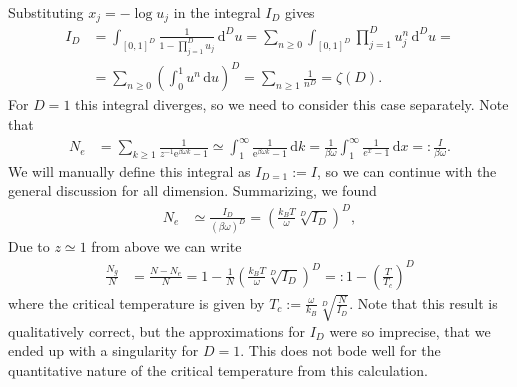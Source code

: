 \documentclass[english, parskip=full]{scrartcl}
\newcommand{\intx}{}
\newcommand{\intr}{}
\newcommand{\kla}{}
\newcommand{\e}{\text{e}}
\begin{document}
Substituting $x_j = -\log u_j$ in the integral $I_D$ gives
\begin{align}
I_D &=  \intx\int_{[0,1]^D} \frac{1}{1 - \prod_{j=1}^D u_j}\, \mathrm{d}^Du = \sum_{n\ge 0} \intx\int_{[0,1]^D} \prod_{j=1}^D u_j^n\, \mathrm{d}^Du = \\
&= \sum_{n\ge 0} \kla\left( \intx\int_{0}^{1} u^n\, \mathrm{d}u \right)^D = \sum_{n\ge 1}\frac{1}{n^D} = \zeta (D).
\end{align}
For $D=1$ this integral diverges, so we need to consider this case separately.
Note that 
\begin{align}
N_e &= \sum_{k \ge 1} \frac{1}{z^{-1}\e^{\beta\omega k} - 1} \simeq \intx\int_{1}^{\infty} \frac{1}{\e^{\beta\omega k} - 1}\, \mathrm{d}k = \frac{1}{\beta\omega} \intx\int_{1}^{\infty} \frac{1}{e^x - 1}\, \mathrm{d}x =: \frac{I}{\beta \omega}.
\end{align}
We will manually define this integral as $I_{D=1} := I$, so we can continue with the general discussion for all dimension.
Summarizing, we found
\begin{align}
N_e &\simeq \frac{I_D}{(\beta\omega)^D} = \kla\left( \frac{k_BT}{\omega } \sqrt[D]{I_D} \right)^D,
\end{align}
Due to $z\simeq 1$ from above we can write
\begin{align}
\frac{N_g}{N} &= \frac{N - N_e}{N} = 1 - \frac{1}{N}\kla\left( \frac{k_BT}{\omega } \sqrt[D]{I_D} \right)^D =: 1 - \kla\left( \frac{T}{T_c} \right)^D
\end{align}
where the critical temperature is given by $T_c := \frac{\omega}{k_B} \sqrt[D]{\frac{N}{I_D}}$.
Note that this result is qualitatively correct, but the approximations for $I_D$ were so imprecise, that we ended up with a singularity for $D=1$.
This does not bode well for the quantitative nature of the critical temperature from this calculation.
\end{document}
